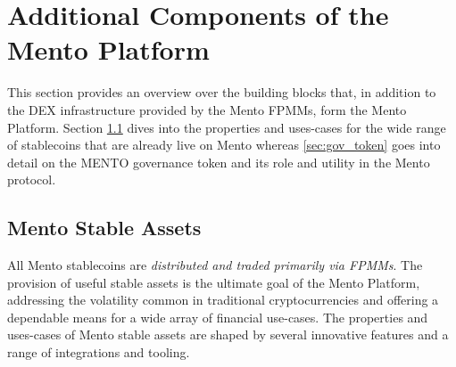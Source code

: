 \documentclass[a4paper]{article}
\theoremstyle{definition}
\begin{document}
\section{Additional Components of the Mento Platform}\label{sec:additional_components}
This section provides an overview over the building blocks that, in addition to the DEX infrastructure provided by the Mento FPMMs, form the Mento Platform. Section \ref{sec:stables} dives into the properties and uses-cases for the wide range of stablecoins that are already live on Mento whereas \ref{sec:gov_token} goes into detail on the MENTO governance token and its role and utility in the Mento protocol. 

\subsection{Mento Stable Assets}\label{sec:stables}
All Mento stablecoins are \emph{distributed and traded primarily via FPMMs}.  The provision of useful stable assets is the ultimate goal of the Mento Platform, addressing the volatility common in traditional cryptocurrencies and offering a dependable means for a wide array of financial use-cases. The properties and uses-cases of Mento stable assets are shaped by several innovative features and a range of integrations and tooling.
\end{document}
